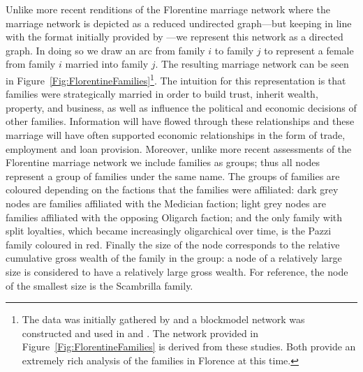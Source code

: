 Unlike more recent renditions of the Florentine marriage network where the marriage network is depicted as a reduced undirected graph---but keeping in line with the format initially provided by \citet[p.~1276--1277]{Padgett1993}---we represent this network as a directed graph. In doing so we draw an arc from family $i$ to family $j$ to represent a female from family $i$ married into family $j$. The resulting marriage network can be seen in Figure~\ref{Fig:FlorentineFamilies}\footnote{The data was initially gathered by \citet{Kent1978} and a blockmodel network was constructed and used in \citet{Padgett1993} and \citet{Padgett1994}. The network provided in Figure~\ref{Fig:FlorentineFamilies} is derived from these studies. Both provide an extremely rich analysis of the families in Florence at this time.}. The intuition for this representation is that families were strategically married in order to build trust, inherit wealth, property, and business, as well as influence the political and economic decisions of other families. Information will have flowed through these relationships and these marriage will have often supported economic relationships in the form of trade, employment and loan provision. Moreover, unlike more recent assessments of the Florentine marriage network we include families as groups; thus all nodes represent a group of families under the same name. The groups of families are coloured depending on the factions that the families were affiliated: dark grey nodes are families affiliated with the Medician faction; light grey nodes are families affiliated with the opposing Oligarch faction; and the only family with split loyalties, which became increasingly oligarchical over time, is the Pazzi family coloured in red. Finally the size of the node corresponds to the relative cumulative gross wealth of the family in the group: a node of a relatively large size is considered to have a relatively large gross wealth. For reference, the node of the smallest size is the Scambrilla family.

